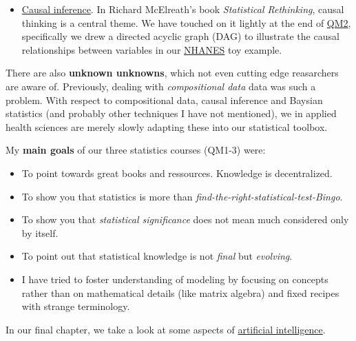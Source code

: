 \documentclass[
]{book}
\providecommand{\tightlist}{%
  \setlength{\itemsep}{0pt}\setlength{\parskip}{0pt}}
\begin{document}
\begin{itemize}
  Here is a \href{https://www.geo.fu-berlin.de/en/v/soga-r/Advances-statistics/Feature-scales/Intro_compositional_data/index.html}{simple example}.
\item
  \href{https://projecteuclid.org/journals/statistics-surveys/volume-3/issue-none/Causal-inference-in-statistics-An-overview/10.1214/09-SS057.full}{Causal inference}.
  In Richard McElreath's book \emph{Statistical Rethinking}, causal thinking is a central theme.
  We have touched on it lightly at the end of \href{https://jdegenfellner.github.io/Script_QM2_ZHAW/multiple-linear-regression.html\#more-than-2-predictors}{QM2},
  specifically we drew a directed acyclic graph (DAG) to illustrate the causal relationships
  between variables in our \href{https://jdegenfellner.github.io/Script_QM2_ZHAW/multiple-linear-regression.html\#example_nhanes}{NHANES} toy example.
\end{itemize}

There are also \textbf{unknown unknowns}, which not even cutting edge reasarchers are aware of.
Previously, dealing with \emph{compositional data} data was such a problem.
With respect to compositional data, causal inference and Baysian statistics (and probably other techniques I have not mentioned),
we in applied health sciences are merely slowly adapting these into our statistical toolbox.

My \textbf{main goals} of our three statistics courses (QM1-3) were:

\begin{itemize}
\tightlist
\item
  To point towards great books and ressources. Knowledge is decentralized.
\item
  To show you that statistics is more than \emph{find-the-right-statistical-test-Bingo}.
\item
  To show you that \emph{statistical significance} does not mean much considered only by itself.
\item
  To point out that statistical knowledge is not \emph{final} but \emph{evolving}.
\item
  I have tried to foster understanding of modeling by focusing on concepts
  rather than on mathematical details (like matrix algebra) and fixed recipes with strange terminology.
\end{itemize}

In our final chapter, we take a look at some aspects of
\href{https://en.wikipedia.org/wiki/Artificial_intelligence}{artificial intelligence}.
\end{document}
